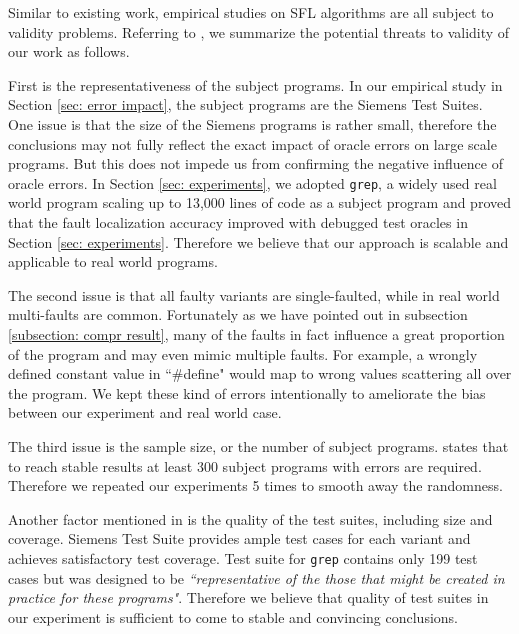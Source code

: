 
Similar to existing work, empirical studies on SFL algorithms are all subject to validity problems. Referring to \cite{Steimann:2013:TVV:2483760.2483767}, we summarize the potential threats to validity of our work as follows.

First is the representativeness of the subject programs. In our empirical study in Section \ref{sec: error impact}, the subject programs are the Siemens Test Suites. One issue is that the size of the Siemens programs is rather small, therefore the conclusions may not fully reflect the exact impact of oracle errors on large scale programs. But this does not impede us from confirming the negative influence of oracle errors. In Section \ref{sec: experiments}, we adopted \texttt{grep}, a widely used real world program scaling up to 13,000 lines of code as a subject program and proved that the fault localization accuracy improved with debugged test oracles in Section \ref{sec: experiments}. Therefore we believe that our approach is scalable and applicable to real world programs.

The second issue is that all faulty variants are single-faulted, while in real world multi-faults are common. Fortunately as we have pointed out in subsection \ref{subsection: compr result}, many of the faults in fact influence a great proportion of the program and may even mimic multiple faults. For example, a wrongly defined constant value in  ``\#define" would map to wrong values scattering all over the program. We kept these kind of errors intentionally to ameliorate the bias between our experiment and real world case.

The third issue is the sample size, or the number of subject programs. \cite{Steimann:2013:TVV:2483760.2483767} states that to reach stable results at least 300 subject programs with errors are required. Therefore we repeated our experiments 5 times to smooth away the randomness.

Another factor mentioned in \cite{Steimann:2013:TVV:2483760.2483767} is the quality of the test suites, including size and coverage. Siemens Test Suite provides ample test cases for each variant and achieves satisfactory test coverage. Test suite for \texttt{grep} contains only 199 test cases but was designed to be \textit{``representative of the those that might be created in practice for these programs"}\cite{doESE05}. Therefore we believe that quality of test suites in our experiment is sufficient to come to stable and convincing conclusions.




